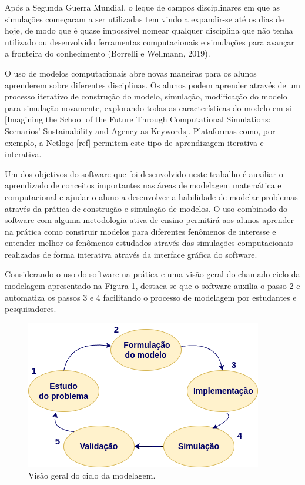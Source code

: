 \documentclass[
	12pt,				%
	openright,			%
	oneside,			%
	a4paper,			%
	main=brazil,
	english,			%
	]{ufsj-abntex2}
\begin{document}
Após a Segunda Guerra Mundial, o leque de campos disciplinares em que as simulações começaram a ser utilizadas tem vindo a expandir-se até os dias de hoje, de modo que é quase impossível nomear qualquer disciplina que não tenha utilizado ou desenvolvido ferramentas computacionais e simulações para avançar a fronteira do conhecimento (Borrelli e Wellmann, 2019).

O uso de modelos computacionais abre novas maneiras para os alunos aprenderem sobre diferentes disciplinas. Os alunos podem aprender através de um processo iterativo de construção do modelo, simulação, modificação do modelo para simulação novamente, explorando todas as características do modelo em si [Imagining the School of the Future Through Computational Simulations: Scenarios’ Sustainability and Agency as Keywords]. Plataformas como, por exemplo, a Netlogo [ref] permitem este tipo de aprendizagem iterativa e interativa.

Um dos objetivos do software que foi desenvolvido neste trabalho é auxiliar o aprendizado de conceitos importantes nas áreas de modelagem matemática e computacional e ajudar o aluno a desenvolver a habilidade de modelar problemas através da prática de construção e simulação de modelos. O uso combinado do software com alguma metodologia ativa de ensino permitirá aos alunos aprender na prática como construir modelos para diferentes fenômenos de interesse e entender melhor os fenômenos estudados através das simulações computacionais realizadas de forma interativa através da interface gráfica do software. 

Considerando o uso do software na prática e uma visão geral do chamado ciclo da modelagem apresentado na Figura \ref{fig:ciclo-modelagem}, destaca-se que o software auxilia o passo 2 e automatiza os passos 3 e 4 facilitando o processo de modelagem por estudantes e pesquisadores. 

\begin{figure}[h]
    \centering
    \includegraphics[scale=0.5]{imgs/ciclo-modelagem.png} 
    \caption{Visão geral do ciclo da modelagem.}
    \label{fig:ciclo-modelagem}
\end{figure}
\end{document}
